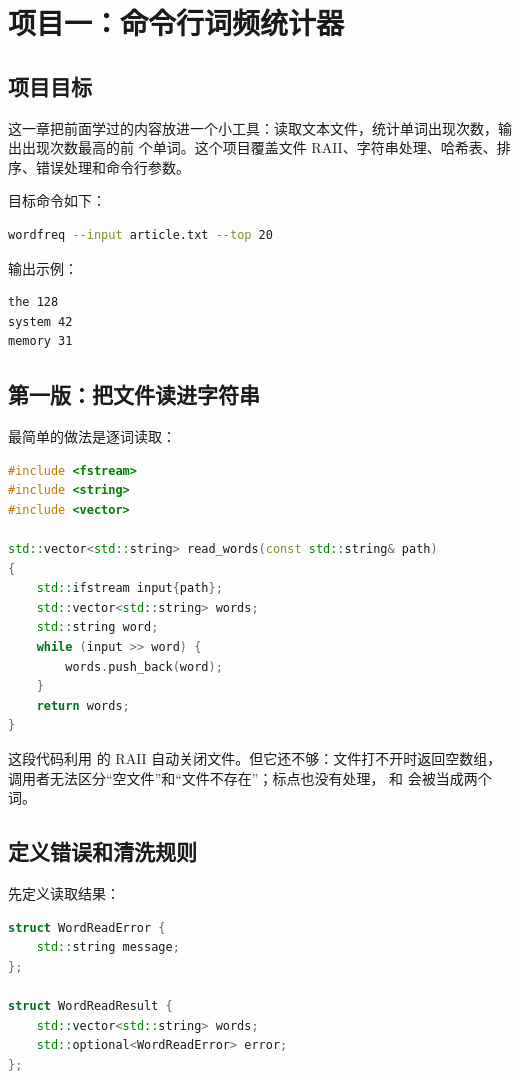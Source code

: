\chapter{项目一：命令行词频统计器}

\section{项目目标}

这一章把前面学过的内容放进一个小工具：读取文本文件，统计单词出现次数，输出出现次数最高的前  个单词。这个项目覆盖文件 RAII、字符串处理、哈希表、排序、错误处理和命令行参数。

目标命令如下：

\begin{lstlisting}[language=bash,caption={词频工具目标用法}]
wordfreq --input article.txt --top 20
\end{lstlisting}

输出示例：

\begin{lstlisting}[caption={词频输出示例}]
the 128
system 42
memory 31
\end{lstlisting}

\section{第一版：把文件读进字符串}

最简单的做法是逐词读取：

\begin{lstlisting}[language=C++,caption={逐词读取文件}]
#include <fstream>
#include <string>
#include <vector>

std::vector<std::string> read_words(const std::string& path)
{
    std::ifstream input{path};
    std::vector<std::string> words;
    std::string word;
    while (input >> word) {
        words.push_back(word);
    }
    return words;
}
\end{lstlisting}

这段代码利用  的 RAII 自动关闭文件。但它还不够：文件打不开时返回空数组，调用者无法区分“空文件”和“文件不存在”；标点也没有处理， 和  会被当成两个词。

\section{定义错误和清洗规则}

先定义读取结果：

\begin{lstlisting}[language=C++,caption={读取结果类型}]
struct WordReadError {
    std::string message;
};

struct WordReadResult {
    std::vector<std::string> words;
    std::optional<WordReadError> error;
};
\end{lstlisting}

